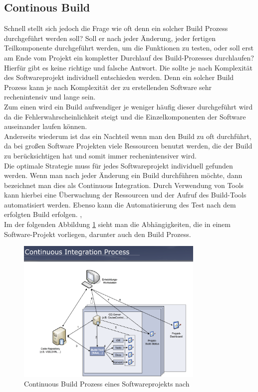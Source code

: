 \subsection{Continous Build}
Schnell stellt sich jedoch die Frage wie oft denn ein solcher Build Prozess durchgeführt werden soll? Soll er nach jeder Änderung, jeder fertigen Teilkomponente durchgeführt werden, um die Funktionen zu testen, oder soll erst am Ende vom Projekt ein kompletter Durchlauf des Build-Prozesses durchlaufen?
\\
Hierfür gibt es keine richtige und falsche Antwort. Die sollte je nach Komplexität des Softwareprojekt individuell entschieden werden. Denn ein solcher Build Prozess kann je nach Komplexität der zu erstellenden Software sehr rechenintensiv und lange sein. 
\\
Zum einen wird ein Build aufwendiger je weniger häufig dieser durchgeführt wird da die Fehlerwahrscheinlichkeit steigt und die Einzelkomponenten der Software auseinander laufen können.
\\
Anderseits wiederum ist das ein Nachteil wenn man den Build zu oft durchführt, da bei großen Software Projekten viele Ressourcen benutzt werden, die der Build zu berücksichtigen hat und somit immer rechenintensiver wird.
\\
Die optimale Strategie muss für jedes Softwareprojekt individuell gefunden werden.
Wenn man nach jeder Änderung ein Build durchführen möchte, 
dann bezeichnet man dies als Continuous Integration.
Durch Verwendung von Tools kann hierbei eine Überwachung der Ressourcen und der Aufruf des Build-Tools automatisiert werden. Ebenso kann die Automatisierung des Test nach dem erfolgten Build erfolgen. \cite{build-seminar}, \cite{software-analysis}
\\
Im der folgenden Abbildung \ref{fig:ci} sieht man die Abhängigkeiten, die in einem Software-Projekt vorliegen, darunter auch den Build Prozess.

\begin{figure}[H]
	\includegraphics[width=0.8\textwidth]{img/continuousintegration.png}
	\caption{Continuous Build Prozess eines Softwareprojekts nach \cite{build-continuous}}
\label{fig:ci}
\end{figure}

